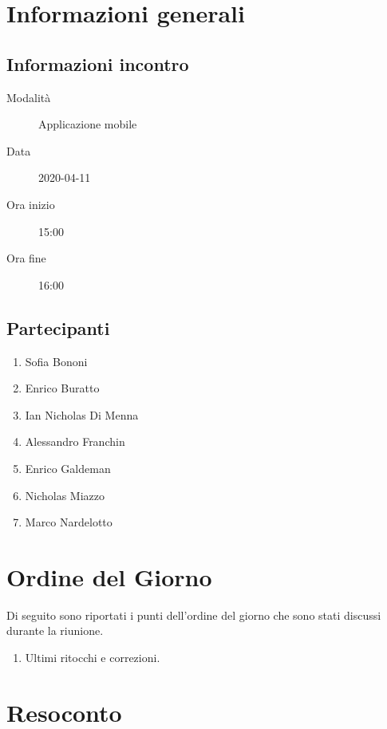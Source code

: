 \documentclass{article}
\begin{document}


\section{Informazioni generali}%
\label{sec:informazioni_generali}

\subsection{Informazioni incontro}%
\label{sub:informazioni_incontro}

\begin{description}
  \item[Modalità] Applicazione mobile 
  \item[Data] 2020-04-11
  \item[Ora inizio] 15:00
  \item[Ora fine] 16:00
\end{description}

\subsection{Partecipanti}%
\label{sub:partecipanti}

\begin{enumerate}
  \item Sofia Bononi
  \item Enrico Buratto
  \item Ian Nicholas Di Menna
  \item Alessandro Franchin
  \item Enrico Galdeman
  \item Nicholas Miazzo
  \item Marco Nardelotto
\end{enumerate}

\section{Ordine del Giorno}%
\label{ordine_del_giorno}
Di seguito sono riportati i punti dell'ordine del giorno che sono stati discussi durante la riunione.
\begin{enumerate}
  \item Ultimi ritocchi e correzioni.
\end{enumerate}

\section{Resoconto}%
\label{resoconto}
\end{document}
